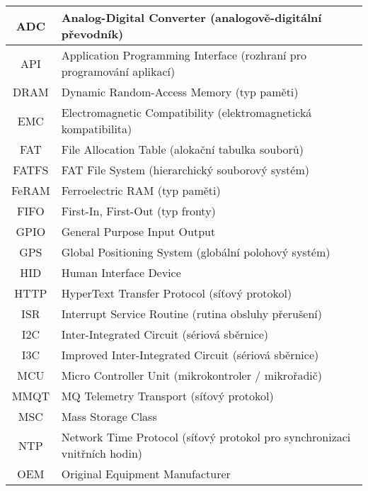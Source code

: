 \begin{longtable}{|c|l|}
ADC     & Analog-Digital Converter (analogově-digitální převodník)                  \\ \hline
API     & Application Programming Interface (rozhraní pro programování aplikací)    \\ \hline
DRAM    & Dynamic Random-Access Memory (typ paměti)                                 \\ \hline
EMC     & Electromagnetic Compatibility (elektromagnetická kompatibilita)           \\ \hline
FAT     & File Allocation Table (alokační tabulka souborů)                          \\ \hline
FATFS   & FAT File System (hierarchický souborový systém)                           \\ \hline
FeRAM   & Ferroelectric RAM (typ paměti)                                            \\ \hline
FIFO    & First-In, First-Out (typ fronty)                                          \\ \hline
GPIO    & General Purpose Input Output                                              \\ \hline
GPS     & Global Positioning System (globální polohový systém)                      \\ \hline
HID     & Human Interface Device                                                    \\ \hline
HTTP    & HyperText Transfer Protocol (síťový protokol)                             \\ \hline
ISR     & Interrupt Service Routine (rutina obsluhy přerušení)                      \\ \hline
I2C     & Inter-Integrated Circuit (sériová sběrnice)                               \\ \hline
I3C     & Improved Inter-Integrated Circuit (sériová sběrnice)                      \\ \hline
MCU     & Micro Controller Unit (mikrokontroler / mikrořadič)                       \\ \hline
MMQT    & MQ Telemetry Transport (síťový protokol)                                  \\ \hline
MSC     & Mass Storage Class                                                        \\ \hline
NTP     & Network Time Protocol (síťový protokol pro synchronizaci vnitřních hodin) \\ \hline
OEM     & Original Equipment Manufacturer                                           \\ \hline

\end{longtable}
